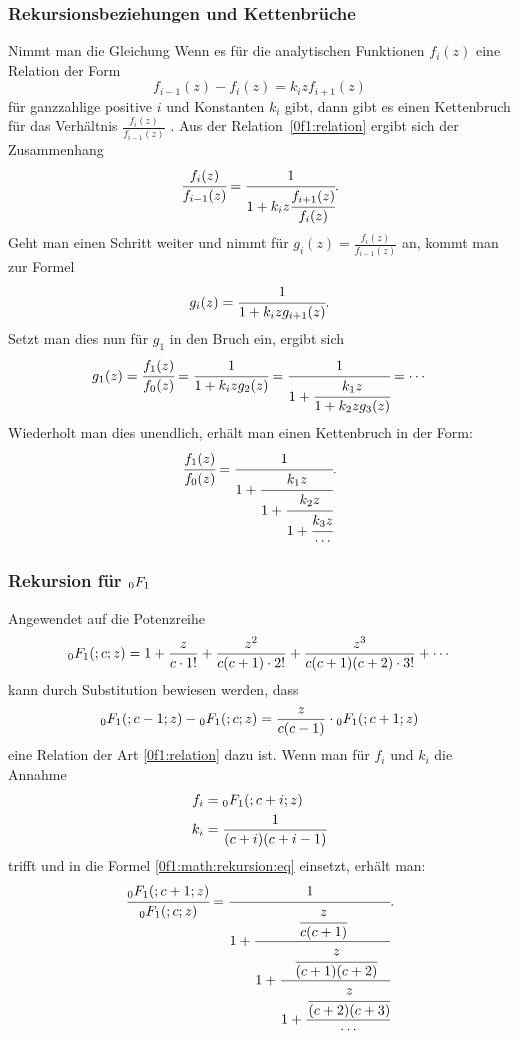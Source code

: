 \subsubsection{Rekursionsbeziehungen und Kettenbrüche}

Nimmt man die Gleichung
Wenn es für die analytischen Funktionen $f_i(z)$ eine Relation der Form
\begin{equation}
	f_{i-1}(z) - f_i(z) = k_i z f_{i+1}(z)
\label{0f1:relation}
\end{equation}
für ganzzahlige positive $i$ und Konstanten $k_i$
gibt,
dann gibt es einen Kettenbruch für das Verhältnis
$\frac{f_i(z)}{f_{i-1}(z)}$ \cite{0f1:wiki-fraction}. 
Aus der Relation~\eqref{0f1:relation}
ergibt sich der Zusammenhang
\begin{equation}
	\cfrac{f_i(z)}{f_{i-1}(z)}
	=
	\cfrac{1}{1+k_iz\cfrac{f_{i+1}(z)}{f_i(z)}}.
\label{0f1:bruchrelation}
\end{equation}
Geht man einen Schritt weiter und nimmt für
$g_i(z) = \frac{f_i(z)}{f_{i-1}(z)}$ an, kommt man zur Formel
\begin{equation*}
	g_i(z) = \cfrac{1}{1+k_izg_{i+1}(z)}.
\end{equation*}
Setzt man dies nun für $g_1$ in den Bruch ein, ergibt sich
\begin{equation*}
	g_1(z) = \cfrac{f_1(z)}{f_0(z)} = \cfrac{1}{1+k_izg_2(z)} = \cfrac{1}{1+\cfrac{k_1z}{1+k_2zg_3(z)}} = \cdots
\end{equation*}
Wiederholt man dies unendlich, erhält man einen Kettenbruch in der Form:
\begin{equation}
	\label{0f1:math:rekursion:eq}
	\cfrac{f_1(z)}{f_0(z)}
	=
	\cfrac{1}{1+\cfrac{k_1z}{1+\cfrac{k_2z}{1+\cfrac{k_3z}{\cdots}}}}.
\end{equation}

\subsubsection{Rekursion für $\mathstrut_0F_1$}
Angewendet auf die Potenzreihe
\begin{equation}
	\label{0f1:math:potenzreihe:0f1:eq}
	\mathstrut_0F_1(;c;z)
	=
	1 + \frac{z}{c\cdot1!} + \frac{z^2}{c(c+1)\cdot2!} + \frac{z^3}{c(c+1)(c+2)\cdot3!} + \cdots
\end{equation}
kann durch Substitution bewiesen werden, dass
\begin{equation*}
	\mathstrut_0F_1(;c-1;z) - \mathstrut_0F_1(;c;z)
	=
	\frac{z}{c(c-1)} \cdot \mathstrut_0F_1(;c+1;z)
\end{equation*}
eine Relation der Art \eqref{0f1:relation} dazu ist.
Wenn man für $f_i$ und $k_i$ die Annahme
\begin{align*}
	f_i &= \mathstrut_0F_1(;c+i;z)\\
	k_i	&= \frac{1}{(c+i)(c+i-1)}
\end{align*}
trifft und in die Formel \eqref{0f1:math:rekursion:eq} einsetzt, erhält man:
\begin{equation*}
	\cfrac{\mathstrut_0F_1(;c+1;z)}{\mathstrut_0F_1(;c;z)}
	=
	\cfrac{1}{1+\cfrac{\cfrac{z}{c(c+1)}}{1+\cfrac{\cfrac{z}{(c+1)(c+2)}}{1+\cfrac{\cfrac{z}{(c+2)(c+3)}}{\cdots}}}}.
\end{equation*}

